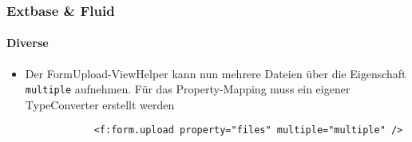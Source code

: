 
\begin{frame}[fragile]
	\frametitle{Extbase \& Fluid}
	\framesubtitle{Diverse}

	\lstset{
		basicstyle=\tiny\ttfamily
	}

	\begin{itemize}
		\item Der FormUpload-ViewHelper kann nun mehrere Dateien über die Eigenschaft \texttt{multiple} aufnehmen. Für das Property-Mapping muss ein eigener TypeConverter erstellt werden
		\begin{lstlisting}
			<f:form.upload property="files" multiple="multiple" />
		\end{lstlisting}

	\end{itemize}

\end{frame}



